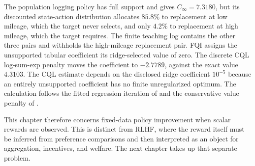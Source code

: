 The population logging policy has full support and gives $C_\infty=7.3180$, but its discounted state-action distribution allocates $85.8\%$ to replacement at low mileage, which the target never selects, and only $4.2\%$ to replacement at high mileage, which the target requires. The finite teaching log contains the other three pairs and withholds the high-mileage replacement pair. FQI assigns the unsupported tabular coefficient its ridge-selected value of zero. The discrete CQL log-sum-exp penalty moves the coefficient to $-2.7789$, against the exact value $4.3103$. The CQL estimate depends on the disclosed ridge coefficient $10^{-5}$ because an entirely unsupported coefficient has no finite unregularized optimum. The calculation follows the fitted regression iteration of \citet{Ernst2005} and the conservative value penalty of \citet{Kumar2020}.
\FloatBarrier

This chapter therefore concerns fixed-data policy improvement when scalar rewards are observed. This is distinct from RLHF, where the reward itself must be inferred from preference comparisons and then interpreted as an object for aggregation, incentives, and welfare. The next chapter takes up that separate problem.
